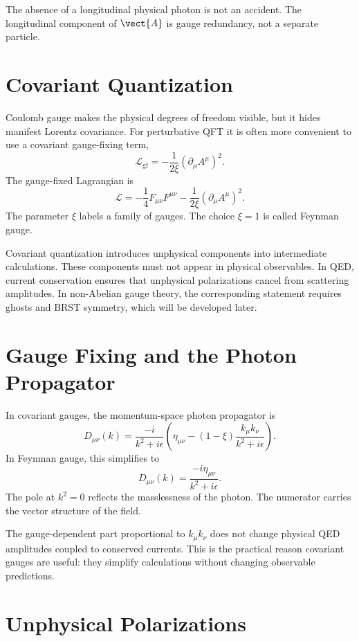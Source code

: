 The absence of a longitudinal physical photon is not an accident. The
longitudinal component of \(\vect{A}\) is gauge redundancy, not a separate
particle.

\section{Covariant Quantization}

Coulomb gauge makes the physical degrees of freedom visible, but it hides
manifest Lorentz covariance. For perturbative QFT it is often more convenient to
use a covariant gauge-fixing term,
\[
    \mathcal{L}_{\mathrm{gf}}
    = -\frac{1}{2\xi}(\partial_\mu A^\mu)^2.
\]
The gauge-fixed Lagrangian is
\[
    \mathcal{L}
    = -\frac{1}{4}F_{\mu\nu}F^{\mu\nu}
      -\frac{1}{2\xi}(\partial_\mu A^\mu)^2.
\]
The parameter \(\xi\) labels a family of gauges. The choice \(\xi=1\) is called
Feynman gauge.

Covariant quantization introduces unphysical components into intermediate
calculations. These components must not appear in physical observables. In QED,
current conservation ensures that unphysical polarizations cancel from
scattering amplitudes. In non-Abelian gauge theory, the corresponding statement
requires ghosts and BRST symmetry, which will be developed later.

\section{Gauge Fixing and the Photon Propagator}

In covariant gauges, the momentum-space photon propagator is
\[
    D_{\mu\nu}(k)
    = \frac{-i}{k^2+i\epsilon}
      \left(
          \eta_{\mu\nu}
          - (1-\xi)\frac{k_\mu k_\nu}{k^2+i\epsilon}
      \right).
\]
In Feynman gauge, this simplifies to
\[
    D_{\mu\nu}(k)
    = \frac{-i\eta_{\mu\nu}}{k^2+i\epsilon}.
\]
The pole at \(k^2=0\) reflects the masslessness of the photon. The numerator
carries the vector structure of the field.

The gauge-dependent part proportional to \(k_\mu k_\nu\) does not change
physical QED amplitudes coupled to conserved currents. This is the practical
reason covariant gauges are useful: they simplify calculations without changing
observable predictions.

\section{Unphysical Polarizations}


